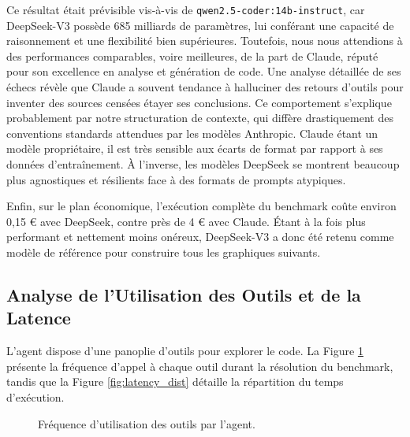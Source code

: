 Ce résultat était prévisible vis-à-vis de \texttt{qwen2.5-coder:14b-instruct}, car DeepSeek-V3 possède 685 milliards de paramètres, lui conférant une capacité de raisonnement et une flexibilité bien supérieures. Toutefois, nous nous attendions à des performances comparables, voire meilleures, de la part de Claude, réputé pour son excellence en analyse et génération de code. Une analyse détaillée de ses échecs révèle que Claude a souvent tendance à halluciner des retours d'outils pour inventer des sources censées étayer ses conclusions. Ce comportement s'explique probablement par notre structuration de contexte, qui diffère drastiquement des conventions standards attendues par les modèles Anthropic. Claude étant un modèle propriétaire, il est très sensible aux écarts de format par rapport à ses données d'entraînement. À l'inverse, les modèles DeepSeek se montrent beaucoup plus agnostiques et résilients face à des formats de prompts atypiques.

Enfin, sur le plan économique, l'exécution complète du benchmark coûte environ 0,15 € avec DeepSeek, contre près de 4 € avec Claude. Étant à la fois plus performant et nettement moins onéreux, DeepSeek-V3 a donc été retenu comme modèle de référence pour construire tous les graphiques suivants.

\subsection{Analyse de l'Utilisation des Outils et de la Latence}

L'agent dispose d'une panoplie d'outils pour explorer le code. La Figure \ref{fig:tool_usage} présente la fréquence d'appel à chaque outil durant la résolution du benchmark, tandis que la Figure \ref{fig:latency_dist} détaille la répartition du temps d'exécution.

\begin{figure}[H]
    \centering
    \caption{Fréquence d'utilisation des outils par l'agent.}
    \label{fig:tool_usage}
\end{figure}

